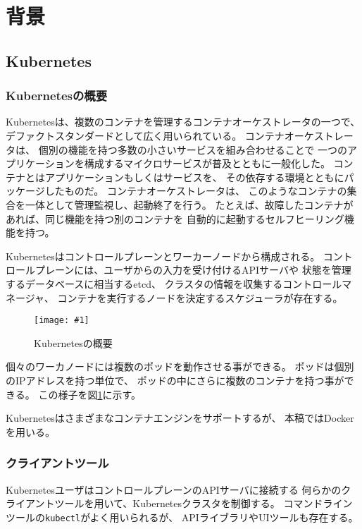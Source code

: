 \documentclass[submit,techrep]{ipsj}
\newcommand{\reffig}[1]{図\ref{#1}}
\newcommand{\epsfig}[4]{
\begin{figure}[tb]
  \begin{center}
    \texttt{[image: \#1]}
  \end{center}
  \caption{#3}
  \label{#4}
\end{figure}}
\newcommand{\kbs}{Kubernetes}
\begin{document}
\section{背景}\label{sec:background}



\subsection{\kbs}
\subsubsection{\kbs の概要}
\kbs\cite{k8s}は、複数のコンテナを管理するコンテナオーケストレータの一つで、
デファクトスタンダードとして広く用いられている。
コンテナオーケストレータは、
個別の機能を持つ多数の小さいサービスを組み合わせることで
一つのアプリケーションを構成するマイクロサービスが普及とともに一般化した。
コンテナとはアプリケーションもしくはサービスを、
その依存する環境とともにパッケージしたものだ。
コンテナオーケストレータは、
このようなコンテナの集合を一体として管理監視し、起動終了を行う。
たとえば、故障したコンテナがあれば、同じ機能を持つ別のコンテナを
自動的に起動するセルフヒーリング機能を持つ。

\kbs はコントロールプレーンとワーカーノードから構成される。
コントロールプレーンには、ユーザからの入力を受け付けるAPIサーバや
状態を管理するデータベースに相当するetcd、
クラスタの情報を収集するコントロールマネージャ、
コンテナを実行するノードを決定するスケジューラが存在する。

\epsfig{figs/kubernetes.pdf}{width=8.5cm}{\kbs の概要}{kubernetes}

個々のワーカノードには複数のポッドを動作させる事ができる。
ポッドは個別のIPアドレスを持つ単位で、
ポッドの中にさらに複数のコンテナを持つ事ができる。
この様子を\reffig{kubernetes}に示す。

\kbs はさまざまなコンテナエンジンをサポートするが、
本稿ではDocker\cite{Docker}を用いる。

\subsubsection{クライアントツール}
\kbs ユーザはコントロールプレーンのAPIサーバに接続する
何らかのクライアントツールを用いて、\kbs クラスタを制御する。
コマンドラインツールの\verb|kubectl|がよく用いられるが、
APIライブラリやUIツールも存在する。


\end{document}
